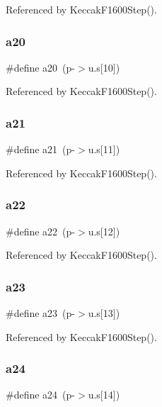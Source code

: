 Referenced by Keccak\+F1600\+Step().

\mbox{\label{shell_8c_a240db0cf8f5ed3ab8d18b19ed789fc52}} 
\subsubsection{a20}
{\footnotesize\ttfamily \#define a20~(p-\/$>$u.\+s[10])}



Referenced by Keccak\+F1600\+Step().

\mbox{\label{shell_8c_ab2beeb03f593e079b37bfe131af6ab3c}} 
\subsubsection{a21}
{\footnotesize\ttfamily \#define a21~(p-\/$>$u.\+s[11])}



Referenced by Keccak\+F1600\+Step().

\mbox{\label{shell_8c_a46920b2a281c18287423d3f9a13577d1}} 
\subsubsection{a22}
{\footnotesize\ttfamily \#define a22~(p-\/$>$u.\+s[12])}



Referenced by Keccak\+F1600\+Step().

\mbox{\label{shell_8c_afd474c85358352215e0235da39cbc1e6}} 
\subsubsection{a23}
{\footnotesize\ttfamily \#define a23~(p-\/$>$u.\+s[13])}



Referenced by Keccak\+F1600\+Step().

\mbox{\label{shell_8c_a30c7ff68eeef12064fc967863108d0b9}} 
\subsubsection{a24}
{\footnotesize\ttfamily \#define a24~(p-\/$>$u.\+s[14])}



